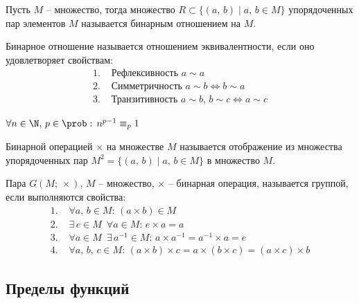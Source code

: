 \documentclass[12pt]{article}
\begin{document}
\begin{definition}
    Пусть $M$ -- множество, тогда множество $R \subset \{(a,\,b)\mid a,\,b\in M\}$ упорядоченных пар элементов $M$ называется бинарным отношением на $M$. 
\end{definition}

\begin{definition}
    Бинарное отношение называется отношением эквивалентности, если оно удовлетворяет свойствам:
    \begin{align*}
        1.\,\,&\text{Рефлексивность } a\sim a\\
        2.\,\,&\text{Симметричность } a\sim b \Longleftrightarrow b\sim a\\
        3.\,\,&\text{Транзитивность } a\sim b,\, b\sim c \Longleftrightarrow a\sim c
    \end{align*}
\end{definition}
\begin{theorem}
    $\forall n\in \N,\, p\in \prob:\, n^{p-1}\equiv_p 1$
\end{theorem}
\begin{definition}
    Бинарной операцией $\times$ на множестве $M$ называется отображение из множества упорядоченных пар $M^2=\{(a,\,b)\mid a,\,b\in M\}$ в множество $M$.
\end{definition}
\begin{definition}
    Пара $G(M;\,\times)$, $M$ -- множество, $\times$ -- бинарная операция, называется группой, если выполняются свойства:
    \begin{align*}
        1.\,\,&\forall a,\,b\in M:\,(a\times b)\in M\\
        2.\,\,&\exists\, e\in M\enspace\forall a\in M:\, e\times a=a\\
        3.\,\,&\forall a\in M\enspace \exists\, a^{-1}\in M:\, a\times a^{-1}=a^{-1}\times a=e\\
        4.\,\,&\forall a,\,b,\,c \in M:\,(a\times b)\times c=a\times(b\times c)= (a\times c)\times b
    \end{align*}
\end{definition}

\subsection{Пределы функций}
\end{document}
